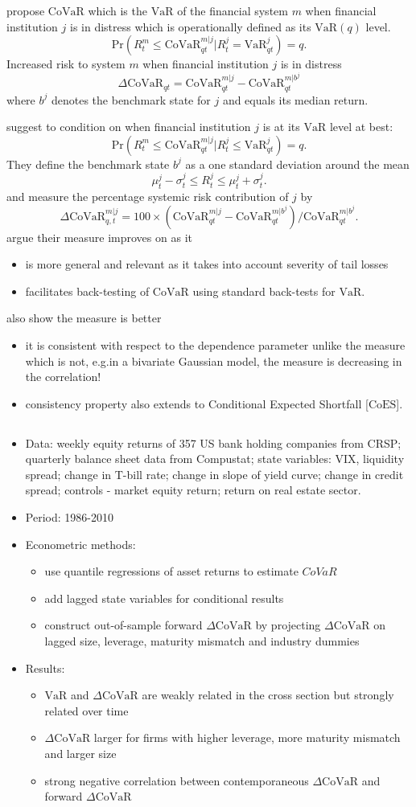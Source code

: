 \documentclass[authoryear]{elsarticle}
\newcommand{\bi}{\begin{itemize}}
\newcommand{\ei}{\end{itemize}}
\renewcommand{\i}{\item}
\newcommand{\var}{\ensuremath{\mathrm{VaR}}}
\newcommand{\covar}{\ensuremath{\mathrm{CoVaR}}}
\newcommand{\coes}{\ensuremath{\mathrm{CoES}}}
\begin{document}
\cite{adrian2011} propose $\covar$ which is the $\var$ of the financial system $m$ when financial institution $j$ is in distress which is operationally defined as its $\var(q)$ level. 
$$\text{Pr}(R_t^m\leq\covar_{qt}^{m|j}|R_t^j=\var_{qt}^j)=q.$$
Increased risk to system $m$ when financial institution $j$ is in distress 
$$\Delta \covar_{qt}=\covar_{qt}^{m|j}-\covar_{qt}^{m|b^j}$$ 
where $b^j$ denotes the benchmark state for $j$ and equals its median return.

\cite{Girardi2013} suggest to condition on when financial institution $j$ is at its $\var$ level at best:
$$\text{Pr}(R_t^m\leq \covar_{qt}^{m|j}|R_t^j\leq \var_{qt}^j)=q.$$ They define the benchmark state $b^j$ as a one standard deviation around the mean
$$\mu_t^j - \sigma_t^j \leq R_t^j \leq \mu_t^j + \sigma_t^j.$$
and measure the percentage systemic risk contribution of $j$ by
$$\Delta \covar_{q,t}^{m|j}=100\times (\covar_{qt}^{m|j}-\covar_{qt}^{m|b^j})/\covar_{qt}^{m|b^j}.$$  \cite{Girardi2013} argue their measure improves on \cite{adrian2011} as it
\bi
\i is more general and relevant as it takes into account severity of tail losses
\i facilitates back-testing of $\covar$ using standard back-tests for $\var$.
\ei
\cite{Mainik2012} also show the \cite{Girardi2013} measure is better 
\bi
\i it is consistent with respect to the dependence parameter unlike the \cite{adrian2011} measure which is not, e.g.in a bivariate Gaussian model, the \cite{adrian2011} measure is decreasing in the correlation! 
\i consistency property also extends to Conditional Expected Shortfall [$\coes$]. 
\ei 


\subsection{\cite{adrian2011}}
\bi
\i Data: weekly equity returns of 357 US bank holding companies from CRSP; quarterly balance sheet data from Compustat; state variables: VIX, liquidity spread; change in T-bill rate; change in slope of yield curve; change in credit spread; controls - market equity return; return on real estate sector.
\i Period:  1986-2010
\i Econometric methods:  
\bi
\i use quantile regressions of asset returns to estimate $CoVaR$ 
\i add lagged state variables for conditional results
\i construct out-of-sample forward $\Delta \covar$ by projecting $\Delta \covar$ on lagged size, leverage, maturity mismatch and industry dummies
\ei
\i Results:
\bi
\i $\var$ and $\Delta \covar$ are weakly related in the cross section but strongly related over time
\i $\Delta \covar$ larger for firms with higher leverage, more maturity mismatch and larger size
\i strong negative correlation between contemporaneous $\Delta \covar$ and forward $\Delta \covar$
\ei
\ei 
\end{document}
